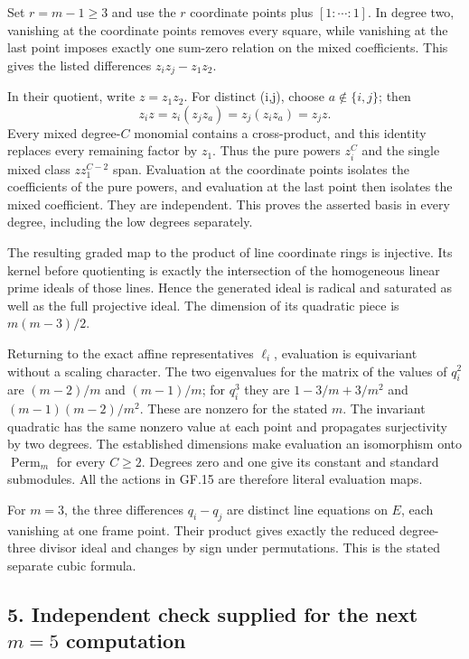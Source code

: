 \documentclass[
  10pt,
]{article}
\begin{document}
Set \(r=m-1\ge3\) and use the \(r\) coordinate points plus
\([1:\cdots:1]\). In degree two, vanishing at the coordinate points
removes every square, while vanishing at the last point imposes exactly
one sum-zero relation on the mixed coefficients. This gives the listed
differences \(z_i z_j-z_1z_2\).

In their quotient, write \(z=z_1z_2\). For distinct (i,j), choose
\(a\notin\{i,j\}\); then \[
z_i z=z_i(z_jz_a)=z_j(z_i z_a)=z_jz.
\] Every mixed degree-\(C\) monomial contains a cross-product, and this
identity replaces every remaining factor by \(z_1\). Thus the pure
powers \(z_i^C\) and the single mixed class \(zz_1^{C-2}\) span.
Evaluation at the coordinate points isolates the coefficients of the
pure powers, and evaluation at the last point then isolates the mixed
coefficient. They are independent. This proves the asserted basis in
every degree, including the low degrees separately.

The resulting graded map to the product of line coordinate rings is
injective. Its kernel before quotienting is exactly the intersection of
the homogeneous linear prime ideals of those lines. Hence the generated
ideal is radical and saturated as well as the full projective ideal. The
dimension of its quadratic piece is \(m(m-3)/2\).

Returning to the exact affine representatives \(\ell_i\), evaluation is
equivariant without a scaling character. The two eigenvalues for the
matrix of the values of \(q_i^2\) are \((m-2)/m\) and \((m-1)/m\); for
\(q_i^3\) they are \(1-3/m+3/m^2\) and \((m-1)(m-2)/m^2\). These are
nonzero for the stated \(m\). The invariant quadratic has the same
nonzero value at each point and propagates surjectivity by two degrees.
The established dimensions make evaluation an isomorphism onto
\(\operatorname{Perm}_m\) for every \(C\ge2\). Degrees zero and one give
its constant and standard submodules. All the actions in GF.15 are
therefore literal evaluation maps.

For \(m=3\), the three differences \(q_i-q_j\) are distinct line
equations on \(E\), each vanishing at one frame point. Their product
gives exactly the reduced degree-three divisor ideal and changes by sign
under permutations. This is the stated separate cubic formula.

\subsection{\texorpdfstring{5. Independent check supplied for the next
\(m=5\)
computation}{5. Independent check supplied for the next m=5 computation}}\label{independent-check-supplied-for-the-next-m5-computation}
\end{document}
